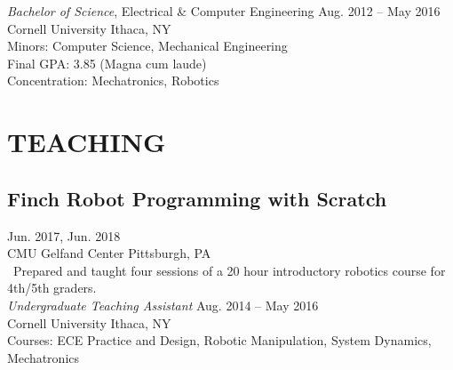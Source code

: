 \documentclass[]{article}
\begin{document}
\emph{Bachelor of Science}, Electrical \& Computer Engineering \hfill Aug. 2012 -- May 2016\\
Cornell University \hfill Ithaca, NY \\
Minors: Computer Science, Mechanical Engineering\\
Final GPA: 3.85 (Magna cum laude) \\
Concentration: Mechatronics, Robotics


\section*{TEACHING}


\subsection*{Finch Robot Programming with Scratch} \hfill Jun. 2017, Jun. 2018 \\
CMU Gelfand Center \hfill Pittsburgh, PA \\
\textellipsis~Prepared and taught four sessions of a 20 hour introductory robotics course for 4th/5th graders. \\

\emph{Undergraduate Teaching Assistant} \hfill Aug. 2014 -- May 2016 \\
Cornell University \hfill Ithaca, NY \\
Courses: ECE Practice and Design, Robotic Manipulation, System Dynamics, Mechatronics


\end{document}
